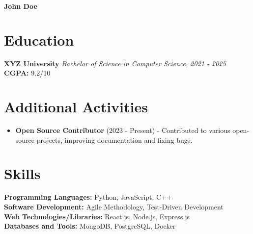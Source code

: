 \documentclass[10pt, letterpaper]{article}
\newenvironment{onecolentry}{}{} %
\newenvironment{highlights}{\begin{itemize}}{\end{itemize}} %
\begin{document}
\begin{center}
    {\LARGE\bfseries John Doe}\\[5pt]
    {}
\end{center}

\section{Education}
\begin{onecolentry}
    \textbf{XYZ University} 
    \textit{Bachelor of Science in Computer Science, 2021 - 2025}\\
    \textbf{CGPA:} 9.2/10
\end{onecolentry}

\section{Additional Activities}
\begin{onecolentry}
    \begin{highlights}
        \item \textbf{Open Source Contributor} (2023 - Present) - Contributed to various open-source projects, improving documentation and fixing bugs.
    \end{highlights}
\end{onecolentry}

\section{Skills}
\textbf{Programming Languages:} Python, JavaScript, C++\\
\textbf{Software Development:} Agile Methodology, Test-Driven Development\\
\textbf{Web Technologies/Libraries:} React.js, Node.js, Express.js\\
\textbf{Databases and Tools:} MongoDB, PostgreSQL, Docker
\end{document}
